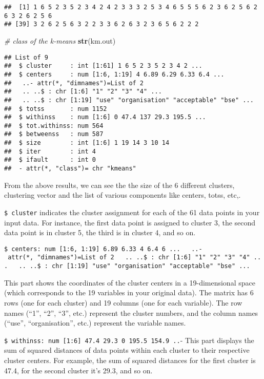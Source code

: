\documentclass[
]{article}
\newenvironment{Shaded}{\begin{snugshade}}{\end{snugshade}}
\newcommand{\CommentTok}[1]{\textcolor[rgb]{0.56,0.35,0.01}{\textit{#1}}}
\newcommand{\FunctionTok}[1]{\textcolor[rgb]{0.13,0.29,0.53}{\textbf{#1}}}
\newcommand{\NormalTok}[1]{#1}
\begin{document}
\begin{verbatim}
##  [1] 1 6 5 2 3 5 2 3 4 2 4 2 3 3 3 2 5 3 4 6 5 5 5 6 2 3 6 2 5 6 2 6 3 2 6 2 5 6
## [39] 3 2 6 2 5 6 3 2 2 3 3 6 2 6 3 2 3 6 5 6 2 2 2
\end{verbatim}

\begin{Shaded}
\begin{Highlighting}[]
\CommentTok{\# class of the k{-}means}
\FunctionTok{str}\NormalTok{(km.out)}
\end{Highlighting}
\end{Shaded}

\begin{verbatim}
## List of 9
##  $ cluster     : int [1:61] 1 6 5 2 3 5 2 3 4 2 ...
##  $ centers     : num [1:6, 1:19] 4 6.89 6.29 6.33 6.4 ...
##   ..- attr(*, "dimnames")=List of 2
##   .. ..$ : chr [1:6] "1" "2" "3" "4" ...
##   .. ..$ : chr [1:19] "use" "organisation" "acceptable" "bse" ...
##  $ totss       : num 1152
##  $ withinss    : num [1:6] 0 47.4 137 29.3 195.5 ...
##  $ tot.withinss: num 564
##  $ betweenss   : num 587
##  $ size        : int [1:6] 1 19 14 3 10 14
##  $ iter        : int 4
##  $ ifault      : int 0
##  - attr(*, "class")= chr "kmeans"
\end{verbatim}

From the above results, we can see the the size of the 6 different
clusters, clustering vector and the list of various components like
centers, totss, etc,.

\texttt{\$\ cluster} indicates the cluster assignment for each of the 61
data points in your input data. For instance, the first data point is
assigned to cluster 3, the second data point is in cluster 5, the third
is in cluster 4, and so on.

\texttt{\$\ centers:\ num\ {[}1:6,\ 1:19{]}\ 6.89\ 6.33\ 4\ 6.4\ 6\ ...\ \ \ ..-\ attr(*,\ "dimnames")=List\ of\ 2\ \ \ ..\ ..\$\ :\ chr\ {[}1:6{]}\ "1"\ "2"\ "3"\ "4"\ ...\ \ \ ..\ ..\$\ :\ chr\ {[}1:19{]}\ "use"\ "organisation"\ "acceptable"\ "bse"\ ...}

This part shows the coordinates of the cluster centers in a
19-dimensional space (which corresponds to the 19 variables in your
original data). The matrix has 6 rows (one for each cluster) and 19
columns (one for each variable). The row names (``1'', ``2'', ``3'',
etc.) represent the cluster numbers, and the column names (``use'',
``organisation'', etc.) represent the variable names.

\texttt{\$\ withinss:\ num\ {[}1:6{]}\ 47.4\ 29.3\ 0\ 195.5\ 154.9\ ..}-
This part displays the sum of squared distances of data points within
each cluster to their respective cluster centers. For example, the sum
of squared distances for the first cluster is 47.4, for the second
cluster it's 29.3, and so on.
\end{document}
